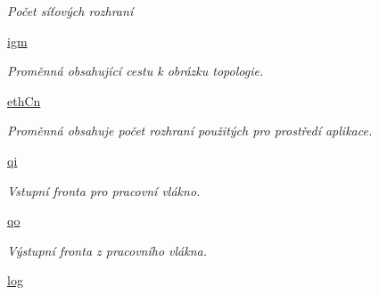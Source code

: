 \begin{DoxyCompactItemize}
\begin{DoxyCompactList}\small\item\em Počet síťových rozhraní \end{DoxyCompactList}\item 
\hypertarget{classcloseSetup_1_1App_af865322161774fe99b14bb037fa9dc87}{\hyperlink{classcloseSetup_1_1App_af865322161774fe99b14bb037fa9dc87}{igm}}\label{df/df9/classcloseSetup_1_1App_af865322161774fe99b14bb037fa9dc87}

\begin{DoxyCompactList}\small\item\em Proměnná obsahující cestu k obrázku topologie. \end{DoxyCompactList}\item 
\hypertarget{classcloseSetup_1_1App_a9bfeb9f737a935b2489732ac5940af55}{\hyperlink{classcloseSetup_1_1App_a9bfeb9f737a935b2489732ac5940af55}{eth\-Cn}}\label{df/df9/classcloseSetup_1_1App_a9bfeb9f737a935b2489732ac5940af55}

\begin{DoxyCompactList}\small\item\em Proměnná obsahuje počet rozhraní použitých pro prostředí aplikace. \end{DoxyCompactList}\item 
\hypertarget{classcloseSetup_1_1App_ad94e177d0372d391443a7441da20de8b}{\hyperlink{classcloseSetup_1_1App_ad94e177d0372d391443a7441da20de8b}{qi}}\label{df/df9/classcloseSetup_1_1App_ad94e177d0372d391443a7441da20de8b}

\begin{DoxyCompactList}\small\item\em Vstupní fronta pro pracovní vlákno. \end{DoxyCompactList}\item 
\hypertarget{classcloseSetup_1_1App_afece39b57a288035a847c0c3590e393a}{\hyperlink{classcloseSetup_1_1App_afece39b57a288035a847c0c3590e393a}{qo}}\label{df/df9/classcloseSetup_1_1App_afece39b57a288035a847c0c3590e393a}

\begin{DoxyCompactList}\small\item\em Výstupní fronta z pracovního vlákna. \end{DoxyCompactList}\item 
\hypertarget{classcloseSetup_1_1App_a8147f5fac97abc783c832707ca0adb56}{\hyperlink{classcloseSetup_1_1App_a8147f5fac97abc783c832707ca0adb56}{log}}\label{df/df9/classcloseSetup_1_1App_a8147f5fac97abc783c832707ca0adb56}


\end{DoxyCompactItemize}
